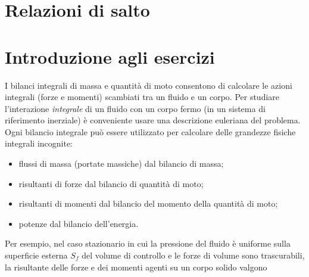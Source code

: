 \section{Relazioni di salto}


\section{Introduzione agli esercizi}
I bilanci integrali di massa e quantità di moto consentono di calcolare le azioni integrali (forze e momenti) scambiati tra un fluido e un corpo. Per studiare l'interazione \textit{integrale} di un fluido con un corpo fermo (in un sistema di riferimento inerziale) è conveniente usare una descrizione euleriana del problema.
Ogni bilancio integrale può essere utilizzato per calcolare delle grandezze fisiche integrali incognite:
\begin{itemize}
 \item flussi di massa (portate massiche) dal bilancio di massa;
 \item risultanti di forze dal bilancio di quantità di moto;
 \item risultanti di momenti dal bilancio del momento della quantità di moto;
 \item potenze dal bilancio dell'energia.
\end{itemize}
Per esempio, nel caso stazionario in cui la pressione del fluido è uniforme sulla superficie esterna $S_f$ del volume di controllo e le forze di volume sono trascurabili, la risultante delle forze e dei momenti agenti su un corpo solido valgono
